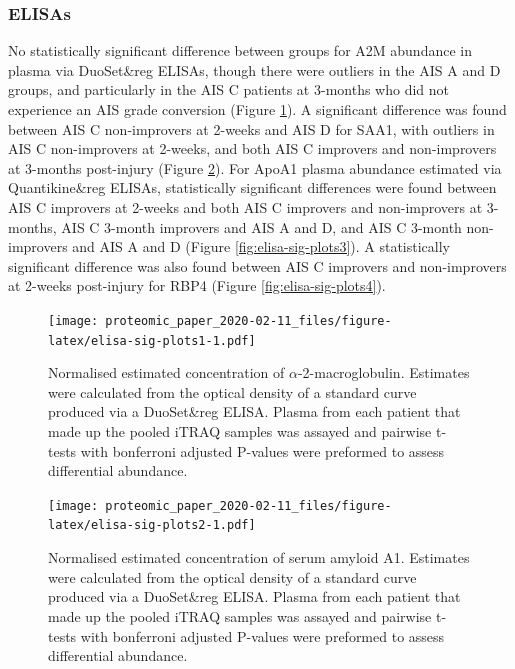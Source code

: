 \documentclass[
]{article}
\begin{document}
\clearpage

\hypertarget{elisas}{%
\subsubsection{ELISAs}\label{elisas}}

No statistically significant difference between groups for A2M abundance in plasma via DuoSet\&reg ELISAs, though there were outliers in the AIS A and D groups, and particularly in the AIS C patients at 3-months who did not experience an AIS grade conversion (Figure \ref{fig:elisa-sig-plots1}).
A significant difference was found between AIS C non-improvers at 2-weeks and AIS D for SAA1, with outliers in AIS C non-improvers at 2-weeks, and both AIS C improvers and non-improvers at 3-months post-injury (Figure \ref{fig:elisa-sig-plots2}).
For ApoA1 plasma abundance estimated via Quantikine\&reg ELISAs, statistically significant differences were found between AIS C improvers at 2-weeks and both AIS C improvers and non-improvers at 3-months, AIS C 3-month improvers and AIS A and D, and AIS C 3-month non-improvers and AIS A and D (Figure \ref{fig:elisa-sig-plots3}).
A statistically significant difference was also found between AIS C improvers and non-improvers at 2-weeks post-injury for RBP4 (Figure \ref{fig:elisa-sig-plots4}).

\clearpage



\begin{figure}
\centering
\texttt{[image: proteomic\_paper\_2020-02-11\_files/figure-latex/elisa-sig-plots1-1.pdf]}
\caption{\label{fig:elisa-sig-plots1}Normalised estimated concentration of \(\alpha\)-2-macroglobulin. Estimates were calculated from the optical density of a standard curve produced via a DuoSet\&reg ELISA. Plasma from each patient that made up the pooled iTRAQ samples was assayed and pairwise t-tests with bonferroni adjusted P-values were preformed to assess differential abundance.}
\end{figure}



\begin{figure}
\centering
\texttt{[image: proteomic\_paper\_2020-02-11\_files/figure-latex/elisa-sig-plots2-1.pdf]}
\caption{\label{fig:elisa-sig-plots2}Normalised estimated concentration of serum amyloid A1. Estimates were calculated from the optical density of a standard curve produced via a DuoSet\&reg ELISA. Plasma from each patient that made up the pooled iTRAQ samples was assayed and pairwise t-tests with bonferroni adjusted P-values were preformed to assess differential abundance.}
\end{figure}
\end{document}

